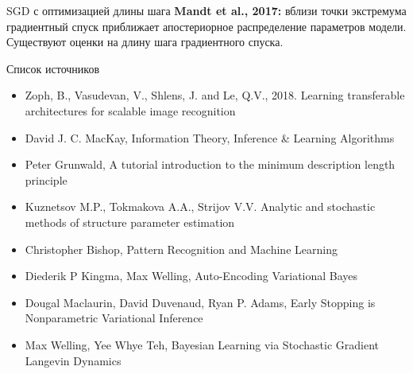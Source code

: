 \documentclass[usenames,dvipsnames,10pt,pdf,utf8,russian,aspectratio=43]{beamer}
\begin{document}
\begin{frame}{SGD с оптимизацией длины шага}
\textbf{Mandt et al., 2017:} вблизи точки экстремума градиентный спуск приближает апостериорное распределение параметров модели. Существуют оценки на длину шага градиентного спуска.

\begin{figure}
  \centering
\label{fig:1}\qquad
\end{figure}

\end{frame}

\begin{frame}{Список источников}
\begin{itemize}
\item Zoph, B., Vasudevan, V., Shlens, J. and Le, Q.V., 2018. Learning transferable architectures for scalable image recognition
\item David J. C. MacKay, Information Theory, Inference \& Learning Algorithms
\item Peter Grunwald, A tutorial introduction to the minimum description length principle
\item Kuznetsov M.P., Tokmakova A.A., Strijov V.V. Analytic and stochastic methods of structure parameter estimation
\item Christopher Bishop, Pattern Recognition and Machine Learning
\item Diederik P Kingma, Max Welling, Auto-Encoding Variational Bayes
\item Dougal Maclaurin, David Duvenaud, Ryan P. Adams, Early Stopping is Nonparametric Variational Inference
\item Max Welling, Yee Whye Teh, Bayesian Learning via Stochastic Gradient Langevin Dynamics
\end{itemize}
\end{frame}
\end{document}
